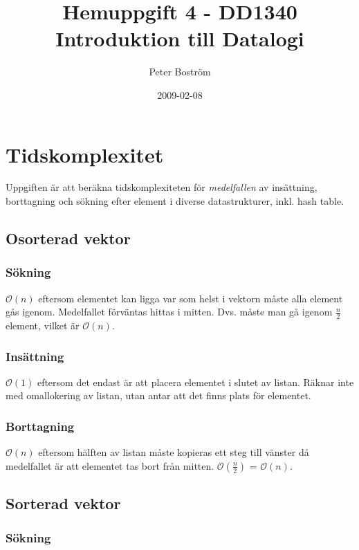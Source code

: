 \documentclass[a4paper,10pt,twoside]{article}
\title{Hemuppgift 4 - DD1340 Introduktion till Datalogi}
\date{2009-02-08}
\author{Peter Boström}
\newcommand{\Ordo}[1]{$\mathcal{O}(#1)$}
\begin{document}
\maketitle %
	\thispagestyle{empty}\cfoot{}
\newpage %
\setcounter{page}{1} %

\section{Tidskomplexitet} %

Uppgiften är att beräkna tidskomplexiteten för \emph{medelfallen} av insättning, borttagning och sökning efter element i diverse datastrukturer, inkl. hash table.

	\subsection{Osorterad vektor}

		\subsubsection*{Sökning}

		\Ordo{n} eftersom elementet kan ligga var som helst i vektorn måste alla element gås igenom. Medelfallet förväntas hittas i mitten. Dvs. måste man gå igenom $\frac{n}{2}$ element, vilket är \Ordo{n}.

		\subsubsection*{Insättning}

		\Ordo{1} eftersom det endast är att placera elementet i slutet av listan. Räknar inte med omallokering av listan, utan antar att det finns plats för elementet.

		\subsubsection*{Borttagning}

		\Ordo{n} eftersom hälften av listan måste kopieras ett steg till vänster då medelfallet är att elementet tas bort från mitten. \Ordo{\frac{n}{2}} = \Ordo{n}.

	\subsection{Sorterad vektor}

		\subsubsection*{Sökning}
\end{document}
